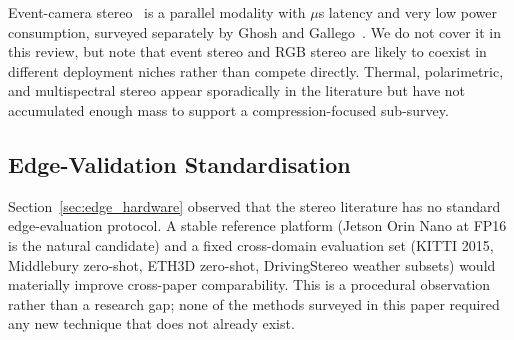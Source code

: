 Event-camera stereo~\cite{ghosh2025eventstereo} is a parallel modality with $\mu$s latency and very low power consumption, surveyed separately by Ghosh and Gallego~\cite{ghosh2025eventstereo}. We do not cover it in this review, but note that event stereo and RGB stereo are likely to coexist in different deployment niches rather than compete directly. Thermal, polarimetric, and multispectral stereo appear sporadically in the literature but have not accumulated enough mass to support a compression-focused sub-survey.

\subsection{Edge-Validation Standardisation}

Section~\ref{sec:edge_hardware} observed that the stereo literature has no standard edge-evaluation protocol. A stable reference platform (Jetson Orin Nano at FP16 is the natural candidate) and a fixed cross-domain evaluation set (KITTI 2015, Middlebury zero-shot, ETH3D zero-shot, DrivingStereo weather subsets) would materially improve cross-paper comparability. This is a procedural observation rather than a research gap; none of the methods surveyed in this paper required any new technique that does not already exist.
